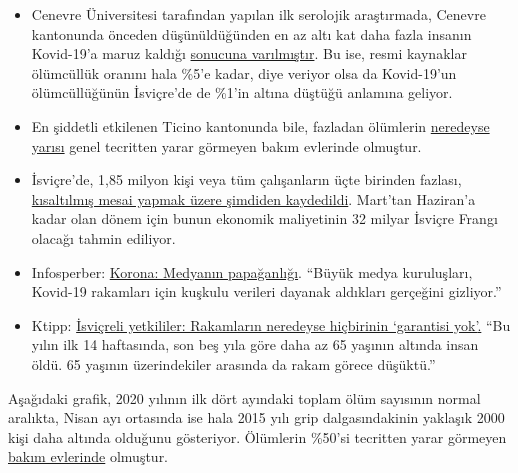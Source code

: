 \begin{itemize}
\tightlist
\item
  Cenevre Üniversitesi tarafından yapılan ilk serolojik araştırmada,
  Cenevre kantonunda önceden düşünüldüğünden en az altı kat daha fazla
  insanın Kovid-19'a maruz kaldığı
  \href{https://www.hug-ge.ch/medias/communique-presse/seroprevalence-covid-19-premiere-estimation}{sonucuna
  varılmıştır}. Bu ise, resmi kaynaklar ölümcüllük oranını hala \%5'e
  kadar, diye veriyor olsa da Kovid-19'un ölümcüllüğünün İsviçre'de de
  \%1'in altına düştüğü anlamına geliyor.
\item
  En şiddetli etkilenen Ticino kantonunda bile, fazladan ölümlerin
  \href{https://www.bluewin.ch/de/news/schweiz/sp-chef-levrat-will-die-reichen-schropfen-383977.html}{neredeyse
  yarısı} genel tecritten yarar görmeyen bakım evlerinde olmuştur.
\item
  İsviçre'de, 1,85 milyon kişi veya tüm çalışanların üçte birinden
  fazlası,
  \href{https://www.bluewin.ch/de/news/schweiz/sp-chef-levrat-will-die-reichen-schropfen-383977.html}{kısaltılmış
  mesai yapmak üzere şimdiden kaydedildi}. Mart'tan Haziran'a kadar olan
  dönem için bunun ekonomik maliyetinin 32 milyar İsviçre Frangı olacağı
  tahmin ediliyor.
\item
  Infosperber:
  \href{https://www.infosperber.ch/Artikel/Medien/Corona-NZZ-deckt-das-Nachplappern-anderer-Medien-auf}{Korona:
  Medyanın papağanlığı}. ``Büyük medya kuruluşları, Kovid-19 rakamları
  için kuşkulu verileri dayanak aldıkları gerçeğini gizliyor.''
\item
  Ktipp:
  \href{https://www.ktipp.ch/artikel/artikeldetail/bund-fast-alle-zahlen-ohne-gewaehr/}{İsviçreli
  yetkililer: Rakamların neredeyse hiçbirinin `garantisi
  yok'}\href{https://www.ktipp.ch/artikel/artikeldetail/bund-fast-alle-zahlen-ohne-gewaehr/}{.}
  ``Bu yılın ilk 14 haftasında, son beş yıla göre daha az 65 yaşının
  altında insan öldü. 65 yaşının üzerindekiler arasında da rakam görece
  düşüktü.''
\end{itemize}

Aşağıdaki grafik, 2020 yılının ilk dört ayındaki toplam ölüm sayısının
normal aralıkta, Nisan ayı ortasında ise hala 2015 yılı grip
dalgasındakinin yaklaşık 2000 kişi daha altında olduğunu gösteriyor.
Ölümlerin \%50'si tecritten yarar görmeyen
\href{https://www.nzz.ch/zuerich/coronavirus-zuerich-aendert-nun-das-testregime-in-heimenauch-viele-aeltere-covid-19-infizierte-entwickeln-keine-symptome-zuerich-aendert-nun-das-testregime-in-heimen-ld.1552089}{bakım
evlerinde} olmuştur.

